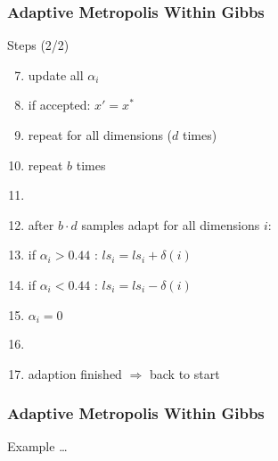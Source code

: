 \begin{frame}
\frametitle{Adaptive Metropolis Within Gibbs}
\begin{block}{Steps (2/2)}
\begin{enumerate}
\setcounter{enumi}{6}
\item update all $\alpha_i$
\item if accepted: $x' = x^*$
\item repeat for all dimensions ($d$ times)
\item repeat $b$ times
\item[]
\item after $b\cdot d$ samples adapt for all dimensions $i$:
\item if $\alpha_i > 0.44$ : $ls_i = ls_i + \delta(i)$
\item if $\alpha_i < 0.44$ : $ls_i = ls_i - \delta(i)$
\item $\alpha_i = 0$
\item []
\item adaption finished $\Rightarrow$ back to start
\end{enumerate}
\end{block}
\end{frame}

\begin{frame}
\frametitle{Adaptive Metropolis Within Gibbs}
Example \ldots
\end{frame}